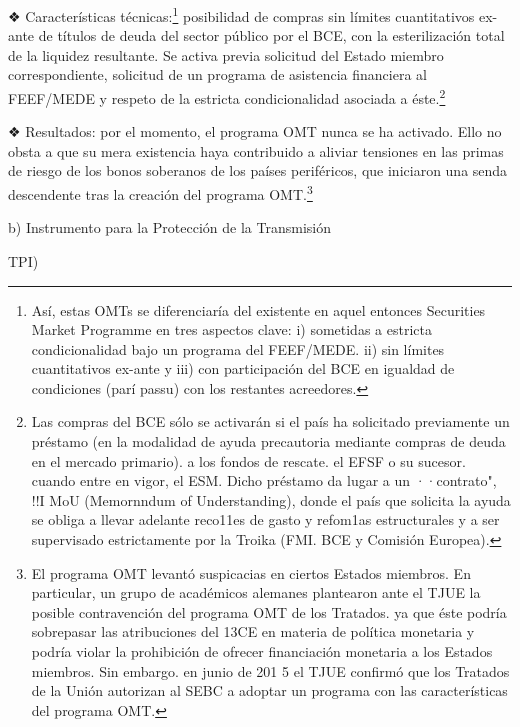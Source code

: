 \documentclass[10pt,a4paper]{article}
\begin{document}
{❖ Características técnicas:\footnote{%
    Así, estas OMTs se diferenciaría del existente en aquel entonces Securities Market Programme en tres aspectos clave: i) sometidas a estricta condicionalidad bajo un programa del FEEF/MEDE. ii) sin límites cuantitativos ex-ante y iii) con participación del BCE en igualdad de condiciones (parí passu) con los restantes acreedores.
} posibilidad de compras sin límites cuantitativos ex-ante de títulos de deuda del sector público por el BCE, con la esterilización total de la liquidez resultante. Se activa previa solicitud del Estado miembro correspondiente, solicitud de un programa de asistencia financiera al FEEF/MEDE y respeto de la estricta condicionalidad asociada a éste.\footnote{%
    Las compras del BCE sólo se activarán si el país ha solicitado previamente un préstamo (en la modalidad de ayuda precautoria mediante compras de deuda en el mercado primario). a los fondos de rescate. el EFSF o su sucesor. cuando entre en vigor, el ESM. Dicho préstamo da lugar a un ··contrato", !!I MoU (Memornndum of Understanding), donde el país que solicita la ayuda se obliga a llevar adelante reco11es de gasto y refom1as estructurales y a ser supervisado estrictamente por la Troika (FMI. BCE y Comisión Europea).
}

❖ Resultados: por el momento, el programa OMT nunca se ha activado. Ello no obsta a que su mera existencia haya contribuido a aliviar tensiones en las primas de riesgo de los bonos soberanos de los países periféricos, que iniciaron una senda descendente tras la creación del programa OMT.\footnote{%
    El programa OMT levantó suspicacias en ciertos Estados miembros. En particular, un grupo de académicos alemanes plantearon ante el TJUE la posible contravención del programa OMT de los Tratados. ya que éste podría sobrepasar las atribuciones del 13CE en materia de política monetaria y podría violar la prohibición de ofrecer financiación monetaria a los Estados miembros. Sin embargo. en junio de 201 5 el TJUE confirmó que los Tratados de la Unión autorizan al SEBC a adoptar un programa con las características del programa OMT.
}

b) Instrumento para la Protección de la Transmisión {TPI)

}}
\end{document}
